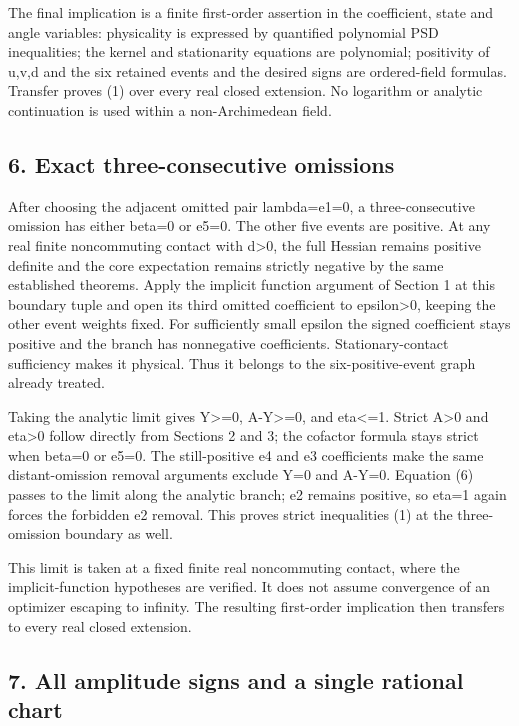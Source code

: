 The final implication is a finite first-order assertion in the coefficient,
state and angle variables: physicality is expressed by quantified
polynomial PSD inequalities; the kernel and stationarity equations are
polynomial; positivity of u,v,d and the six retained events and the desired
signs are ordered-field formulas. Transfer proves (1) over every real
closed extension. No logarithm or analytic continuation is used within a
non-Archimedean field.

\hypertarget{exact-three-consecutive-omissions}{%
\subsection{6. Exact three-consecutive omissions}\label{pe31b9ef5ec43:exact-three-consecutive-omissions}}

After choosing the adjacent omitted pair lambda=e1=0, a three-consecutive
omission has either beta=0 or e5=0. The other five events are positive.
At any real finite noncommuting contact with d\textgreater0, the full Hessian remains
positive definite and the core expectation remains strictly negative by
the same established theorems. Apply the implicit function argument of
Section 1 at this boundary tuple and open its third omitted coefficient
to epsilon\textgreater0, keeping the other event weights fixed. For sufficiently
small epsilon the signed coefficient stays positive and the branch has
nonnegative coefficients. Stationary-contact sufficiency makes it physical.
Thus it belongs to the six-positive-event graph already treated.

Taking the analytic limit gives Y\textgreater=0, A-Y\textgreater=0, and eta\textless=1. Strict A\textgreater0 and
eta\textgreater0 follow directly from Sections 2 and 3; the cofactor formula stays
strict when beta=0 or e5=0. The still-positive e4 and e3 coefficients make
the same distant-omission removal arguments exclude Y=0 and A-Y=0.
Equation (6) passes to the limit along the analytic branch; e2 remains
positive, so eta=1 again forces the forbidden e2 removal. This proves
strict inequalities (1) at the three-omission boundary as well.

This limit is taken at a fixed finite real noncommuting contact, where the
implicit-function hypotheses are verified. It does not assume convergence
of an optimizer escaping to infinity. The resulting first-order implication
then transfers to every real closed extension.

\hypertarget{all-amplitude-signs-and-a-single-rational-chart}{%
\subsection{7. All amplitude signs and a single rational chart}\label{pe31b9ef5ec43:all-amplitude-signs-and-a-single-rational-chart}}

